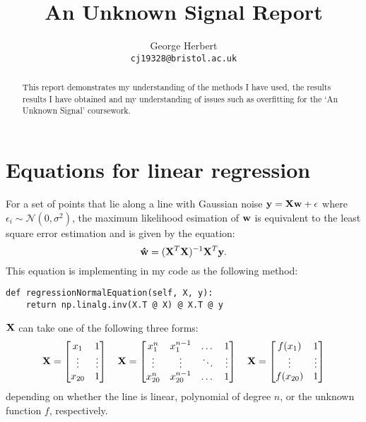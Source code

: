 \documentclass[onecolumn, 11pt, a4paper]{article}
\author{
  George Herbert\\
  \texttt{cj19328@bristol.ac.uk}
}
\title{An Unknown Signal Report}
\begin{document}
\maketitle

\begin{abstract}
    This report demonstrates my understanding of the methods I have 
    used, the results results I have obtained and my understanding
    of issues such as overfitting for the `An Unknown Signal'
    coursework.
\end{abstract}

\section{Equations for linear regression}

For a set of points that lie along a line with Gaussian noise 
$\vb{y} = \vb{X}\vb{w} + \vb{\epsilon}$ where $\epsilon_{i} \sim \mathcal{N}(0, \sigma^{2})$,
the maximum likelihood esimation of $\vb{w}$ is equivalent to
the least square error estimation and is given by the equation:
\[
    \vb{\hat{w}} = (\vb{X}^{T}\vb{X})^{-1}\vb{X}^{T}\vb{y}.
\]
This equation is implementing in my code as the following
method:
\begin{verbatim}
def regressionNormalEquation(self, X, y):
    return np.linalg.inv(X.T @ X) @ X.T @ y
\end{verbatim}

$\vb{X}$ can take one of the following
three forms:
\[
\vb{X} =
\begin{bmatrix}
    x_{1} & 1 \\
    \vdots & \vdots \\
    x_{20} & 1 \\
\end{bmatrix}
\quad
\vb{X} =
\begin{bmatrix}
    x_{1}^{n} & x_{1}^{n-1} & \dots & 1 \\
    \vdots & \vdots & \ddots & \vdots \\
    x_{20}^{n} & x_{20}^{n-1} & \dots & 1 \\
\end{bmatrix}
\quad
\vb{X} =
\begin{bmatrix}
    f(x_{1}) & 1 \\
    \vdots & \vdots \\
    f(x_{20}) & 1 \\
\end{bmatrix}
\]
depending on whether the line is linear, polynomial of degree $n$,
or the unknown function $f$, respectively.
\end{document}
